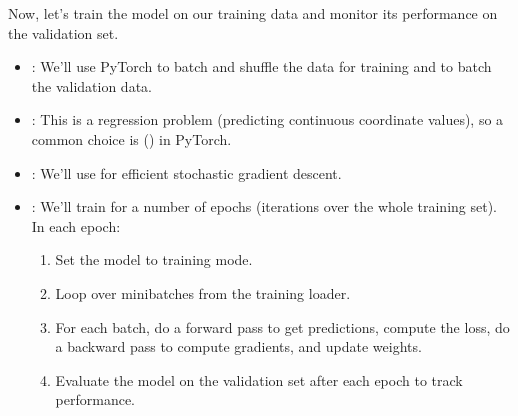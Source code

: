 \documentclass[letterpaper,10pt,english]{jupyterBook}
\begin{document}
\sphinxAtStartPar
Now, let’s train the model on our training data and monitor its performance on the validation set.
\begin{itemize}
\item {} 
\sphinxAtStartPar
{}: We’ll use PyTorch  to batch and shuffle the data for training and to batch the validation data.

\item {} 
\sphinxAtStartPar
{}: This is a regression problem (predicting continuous coordinate values), so a common choice is  () in PyTorch.

\item {} 
\sphinxAtStartPar
{}: We’ll use  for efficient stochastic gradient descent.

\item {} 
\sphinxAtStartPar
{}: We’ll train for a number of epochs (iterations over the whole training set). In each epoch:
\begin{enumerate}
%
\item {} 
\sphinxAtStartPar
Set the model to training mode.

\item {} 
\sphinxAtStartPar
Loop over mini\sphinxhyphen{}batches from the training loader.

\item {} 
\sphinxAtStartPar
For each batch, do a forward pass to get predictions, compute the loss, do a backward pass to compute gradients, and update weights.

\item {} 
\sphinxAtStartPar
Evaluate the model on the validation set after each epoch to track performance.

\end{enumerate}

\end{itemize}
\end{document}
